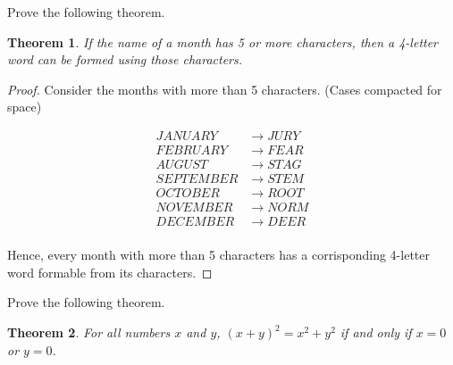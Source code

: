 \documentclass{article} %
\theoremstyle{plain}
\newtheorem*{theorem*}{Theorem}
\begin{document}
\noindent{} Prove the following theorem. 

\begin{theorem*}
If the name of a month has 5 or more characters, then a 4-letter word can be formed using those characters.
\end{theorem*}

\begin{proof}
    Consider the months with more than 5 characters. (Cases compacted for space)

    \begin{align*}
        JANUARY & \to JURY \\
        FEBRUARY & \to FEAR \\
        AUGUST & \to STAG \\
        SEPTEMBER & \to STEM \\
        OCTOBER & \to ROOT \\
        NOVEMBER & \to NORM \\
        DECEMBER & \to DEER \\
    \end{align*}

    Hence, every month with more than 5 characters has a corrisponding 4-letter word formable from its characters.
\end{proof} 

\noindent{} Prove the following theorem. 

\begin{theorem*}
For all numbers $x$ and $y$,  $(x+y)^2=x^2+y^2$ if and only if $x=0$ or $y=0$. 
\end{theorem*}

\end{document}
